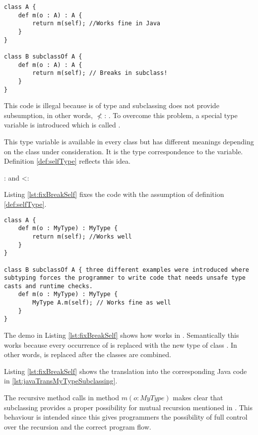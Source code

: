 \begin{lstlisting}[float=ht,language=ooplss,caption=Illegal method m(o : \A) : \emph{Void} in class \B,label=lst:breakSelf]
class A {
	def m(o : A) : A {
		return m(self); //Works fine in Java
	}
}

class B subclassOf A {
	def m(o : A) : A {
		return m(self); // Breaks in subclass!
	}
}
\end{lstlisting}

This code is illegal because \self is of type \B and subclassing does
not provide subsumption, in other words, \B $\nless$: \A. To overcome this problem,
a special type variable is introduced which is called \mytype.

This type variable is available in every class but has different meanings
depending on the class under consideration. It is the type correspondence
to the \self variable. Definition \ref{def:selfType} reflects this idea.

\begin{defn}
	\label{def:selfType}
	\self : \X and \X <: \mytype
\end{defn}

Listing \ref{lst:fixBreakSelf} fixes the code with the assumption of
definition \ref{def:selfType}.

\begin{lstlisting}[float=ht,language=ooplss,caption=Type safe code with \mytype,label=lst:fixBreakSelf]
class A {
	def m(o : MyType) : MyType {
		return m(self); //Works well
	}
}

class B subclassOf A { three different examples were introduced where subtyping forces the programmer to write code that needs unsafe type casts and runtime checks.
	def m(o : MyType) : MyType {
		MyType A.m(self); // Works fine as well
	}
}
\end{lstlisting}

The demo in Listing \ref{lst:fixBreakSelf} shows how \mytype works
in \ooplss. Semantically this works because every occurrence of \mytype
is replaced with the new type of class \B. In other words, \mytype is
replaced after the classes are combined.

Listing \ref{lst:fixBreakSelf} shows the translation into the corresponding
Java code in \ref{lst:javaTransMyTypeSubclassing}.

The recursive
method calls in method $m(o : MyType)$ makes clear that subclassing
provides a proper possibility for mutual recursion mentioned in
. This behaviour is intended since this gives
programmers the possibility of full control over the recursion
and the correct program flow.

